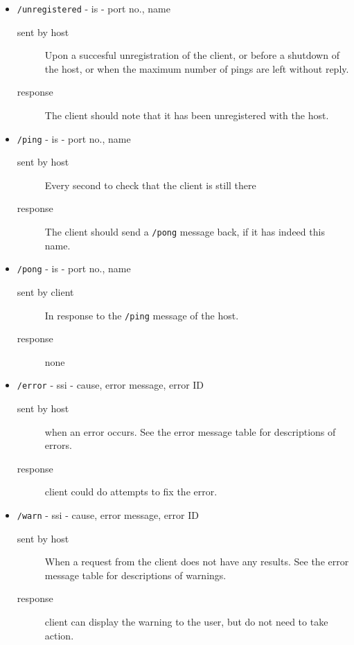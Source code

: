 \documentclass[letterpaper,10pt]{article}
\begin{document}
\begin{itemize}
\item \verb|/unregistered| - is - port no., name
    \begin{description}
     \item[sent by host] Upon a succesful unregistration of the client, or before a shutdown of the host, or when the maximum number of pings are left without reply.
     \item[response] The client should note that it has been unregistered with the host.
   \end{description}

\item \verb|/ping| - is - port no., name
    \begin{description}
     \item[sent by host] Every second to check that the client is still there
     \item[response] The client should send a \verb|/pong| message back, if it has indeed this name.
   \end{description}

\item \verb|/pong| - is - port no., name
    \begin{description}
     \item[sent by client] In response to the \verb|/ping| message of the host.
     \item[response] none
   \end{description}

\item \verb|/error| - ssi - cause, error message, error ID
    \begin{description}
     \item[sent by host] when an error occurs. See the error message table for descriptions of errors.
     \item[response] client could do attempts to fix the error.
   \end{description}

\item \verb|/warn| - ssi - cause, error message, error ID
    \begin{description}
     \item[sent by host] When a request from the client does not have any results. See the error message table for descriptions of warnings.
     \item[response] client can display the warning to the user, but do not need to take action.
   \end{description}



\end{itemize}
\end{document}
